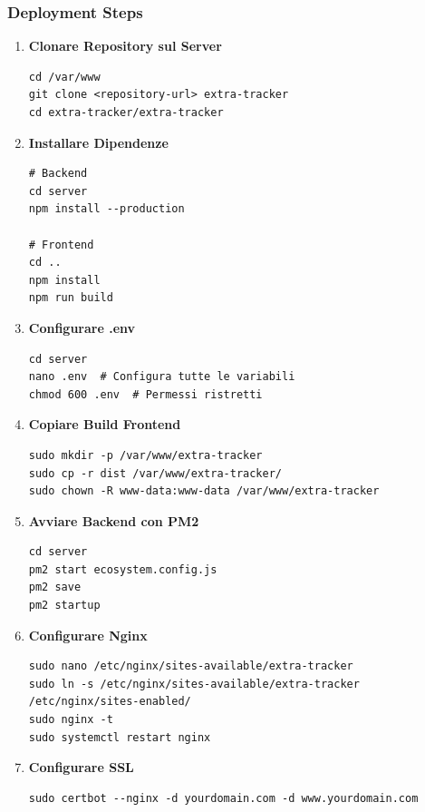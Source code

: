 \documentclass[11pt,a4paper]{article}
\begin{document}
\subsubsection{Deployment Steps}

\begin{enumerate}
    \item \textbf{Clonare Repository sul Server}
    \begin{lstlisting}
cd /var/www
git clone <repository-url> extra-tracker
cd extra-tracker/extra-tracker
    \end{lstlisting}
    
    \item \textbf{Installare Dipendenze}
    \begin{lstlisting}
# Backend
cd server
npm install --production

# Frontend
cd ..
npm install
npm run build
    \end{lstlisting}
    
    \item \textbf{Configurare .env}
    \begin{lstlisting}
cd server
nano .env  # Configura tutte le variabili
chmod 600 .env  # Permessi ristretti
    \end{lstlisting}
    
    \item \textbf{Copiare Build Frontend}
    \begin{lstlisting}
sudo mkdir -p /var/www/extra-tracker
sudo cp -r dist /var/www/extra-tracker/
sudo chown -R www-data:www-data /var/www/extra-tracker
    \end{lstlisting}
    
    \item \textbf{Avviare Backend con PM2}
    \begin{lstlisting}
cd server
pm2 start ecosystem.config.js
pm2 save
pm2 startup
    \end{lstlisting}
    
    \item \textbf{Configurare Nginx}
    \begin{lstlisting}
sudo nano /etc/nginx/sites-available/extra-tracker
sudo ln -s /etc/nginx/sites-available/extra-tracker /etc/nginx/sites-enabled/
sudo nginx -t
sudo systemctl restart nginx
    \end{lstlisting}
    
    \item \textbf{Configurare SSL}
    \begin{lstlisting}
sudo certbot --nginx -d yourdomain.com -d www.yourdomain.com
    \end{lstlisting}
    

\end{enumerate}
\end{document}
